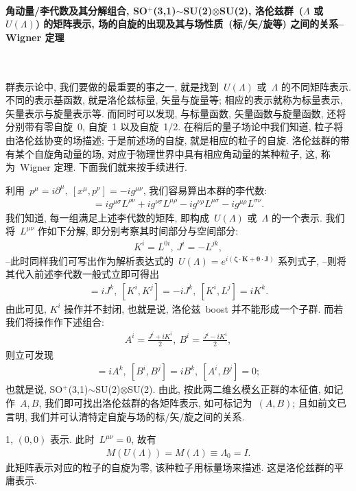 \paragraph{角动量/李代数及其分解组合, SO$^+$(3,1)$\sim$SU(2)$\otimes$SU(2), 洛伦兹群~($\Lambda$ 或~$U(\Lambda)$) 的矩阵表示, 场的自旋的出现及其与场性质~(标/矢/旋等) 之间的关系--Wigner 定理}
~

群表示论中, 我们要做的最重要的事之一, 就是找到~$U(\Lambda)$ 或~$\Lambda$ 的不同矩阵表示. 不同的表示基函数, 就是洛伦兹标量, 矢量与旋量等; 相应的表示就称为标量表示, 矢量表示与旋量表示等. 而同时可以发现, 与标量函数, 矢量函数与旋量函数, 还将分别带有零自旋~0, 自旋~1 以及自旋~1/2. 在稍后的量子场论中我们知道, 粒子将由洛伦兹协变的场描述; 于是前述场的自旋, 就是相应的粒子的自旋. 洛伦兹群的带有某个自旋角动量的场, 对应于物理世界中具有相应角动量的某种粒子, 这, 称为~Wigner 定理. 下面我们就来按手续进行.





利用~$p^\mu=i\partial^\mu,~[x^\mu,p^\nu]=-ig^{\mu\nu}$, 我们容易算出本群的李代数:
\begin{align}
[L^{\mu\nu},L^{\rho\sigma}]=ig^{\mu\sigma}L^{\rho\nu}+ig^{\nu\sigma}L^{\mu\rho}-ig^{\nu\rho}L^{\mu\sigma}-ig^{\mu\rho}L^{\sigma\nu}.
\end{align}
我们知道, 每一组满足上述李代数的矩阵, 即构成~$U(\Lambda)$ 或~$\Lambda$ 的一个表示. 我们将~$L^{\mu\nu}$ 作如下分解, 即分别考察其时间部分与空间部分:
\begin{align}
K^i=L^{0i},~J^i=-L^{jk},
\end{align}
--此时同样我们可写出作为解析表达式的~$U(\Lambda)=e^{i(\bm{\zeta}\cdot\bm{K}+\bm{\theta}\cdot\bm{J})}$ 系列式子, --则将其代入前述李代数一般式立即可得出
\begin{align}
[J^i,J^j]=iJ^k,~[K^i,K^j]=-iJ^k,~[K^i,L^j]=iK^k.
\end{align}
由此可见, $K^i$ 操作并不封闭, 也就是说, 洛伦兹~boost 并不能形成一个子群. 而若我们将操作作下述组合:
\begin{align}
A^i=\frac{J^i+iK^i}{2},~B^i=\frac{J^i-iK^i}{2},
\end{align}
则立可发现
\begin{align}
[A^i,A^j]=iA^k,~[B^i,B^j]=iB^k,~[A^i,B^j]=0;
\end{align}
也就是说, SO$^+$(3,1)$\sim$SU(2)$\otimes$SU(2). 由此, 按此两二维幺模幺正群的本征值, 如记作~$A,B$, 我们即可找出洛伦兹群的各矩阵表示, 如可标记为~$(A,B)$; 且如前文已言明, 我们并可认清特定自旋与场的标/矢/旋之间的关系.


1, $(0,0)$ 表示. 此时~$L^{\mu\nu}=0$, 故有
\begin{align}
M(U(\Lambda))=M(\Lambda)\equiv\Lambda_0=I.
\end{align}
此矩阵表示对应的粒子的自旋为零, 该种粒子用标量场来描述. 这是洛伦兹群的平庸表示.

